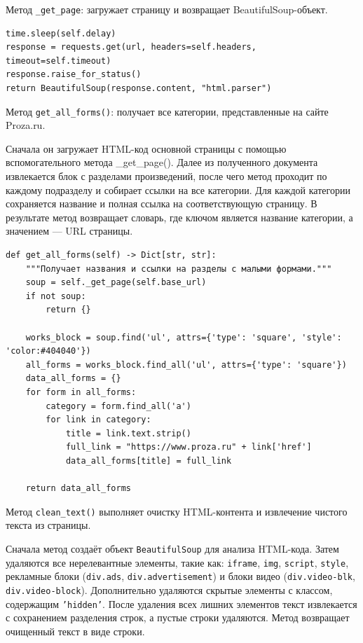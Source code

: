\documentclass[coursework]{SCWorks}
\begin{document}
    Метод \texttt{\_get\_page}: загружает страницу и возвращает BeautifulSoup-объект.
    \begin{verbatim}
time.sleep(self.delay)
response = requests.get(url, headers=self.headers, timeout=self.timeout)
response.raise_for_status()
return BeautifulSoup(response.content, "html.parser")
    \end{verbatim}


    Метод \texttt{get\_all\_forms()}: получает все категории, представленные на сайте Proza.ru.

    Сначала он загружает HTML-код основной страницы с помощью вспомогательного метода \_get\_page().
    Далее из полученного документа извлекается блок с разделами произведений,
    после чего метод проходит по каждому подразделу и собирает ссылки на все категории.
    Для каждой категории сохраняется название и полная ссылка на соответствующую страницу.
    В результате метод возвращает словарь, где ключом является название категории, а значением — URL страницы.

    \begin{verbatim}
def get_all_forms(self) -> Dict[str, str]:
    """Получает названия и ссылки на разделы с малыми формами."""
    soup = self._get_page(self.base_url)
    if not soup:
        return {}

    works_block = soup.find('ul', attrs={'type': 'square', 'style': 'color:#404040'})
    all_forms = works_block.find_all('ul', attrs={'type': 'square'})
    data_all_forms = {}
    for form in all_forms:
        category = form.find_all('a')
        for link in category:
            title = link.text.strip()
            full_link = "https://www.proza.ru" + link['href']
            data_all_forms[title] = full_link

    return data_all_forms
    \end{verbatim}

    Метод \texttt{clean\_text()} выполняет очистку HTML-контента и извлечение чистого текста из страницы.

    Сначала метод создаёт объект \texttt{BeautifulSoup} для анализа HTML-кода.
    Затем удаляются все нерелевантные элементы, такие как: \texttt{iframe}, \texttt{img}, \texttt{script}, \texttt{style}, рекламные блоки (\texttt{div.ads}, \texttt{div.advertisement}) и блоки видео (\texttt{div.video-blk}, \texttt{div.video-block}).
    Дополнительно удаляются скрытые элементы с классом, содержащим \texttt{'hidden'}.
    После удаления всех лишних элементов текст извлекается с сохранением разделения строк, а пустые строки удаляются.
    Метод возвращает очищенный текст в виде строки.
\end{document}
